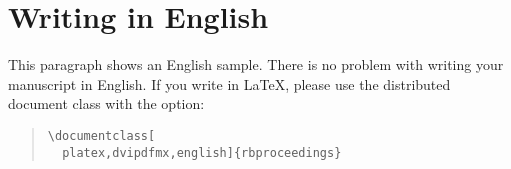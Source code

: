 \section{Writing in English}
This paragraph shows an English sample.
There is no problem with writing your manuscript in English.
If you write in LaTeX, please use the distributed document class with the  option:
\begin{quote}
\verb|\documentclass[|\\
\verb|  platex,dvipdfmx,english]{rbproceedings}|
\end{quote}